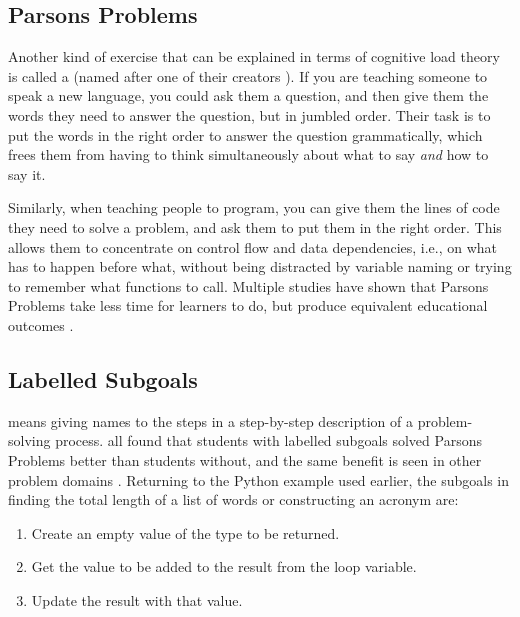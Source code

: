 \subsection*{Parsons Problems}

Another kind of exercise that can be explained in terms of cognitive
load theory is called a 
(named after one of their creators \cite{Pars2006}). If you are
teaching someone to speak a new language, you could ask them a
question, and then give them the words they need to answer the
question, but in jumbled order. Their task is to put the words in the
right order to answer the question grammatically, which frees them
from having to think simultaneously about what to say \emph{and} how
to say it.

Similarly, when teaching people to program, you can give them the lines
of code they need to solve a problem, and ask them to put them in the
right order. This allows them to concentrate on control flow and data
dependencies, i.e., on what has to happen before what, without being
distracted by variable naming or trying to remember what functions to
call. Multiple studies have shown that Parsons Problems take less time
for learners to do, but produce equivalent educational outcomes
\cite{Eric2017}.

\subsection*{Labelled Subgoals}

 means giving names
to the steps in a step-by-step description of a problem-solving
process.  \cite{Marg2016,Morr2016} all found that students with
labelled subgoals solved Parsons Problems better than students
without, and the same benefit is seen in other problem domains
\cite{Marg2012}.  Returning to the Python example used earlier,
the subgoals in finding the total length of a list of words or
constructing an acronym are:

\begin{enumerate}

\item Create an empty value of the type to be returned.

\item Get the value to be added to the result from the loop variable.

\item Update the result with that value.

\end{enumerate}

